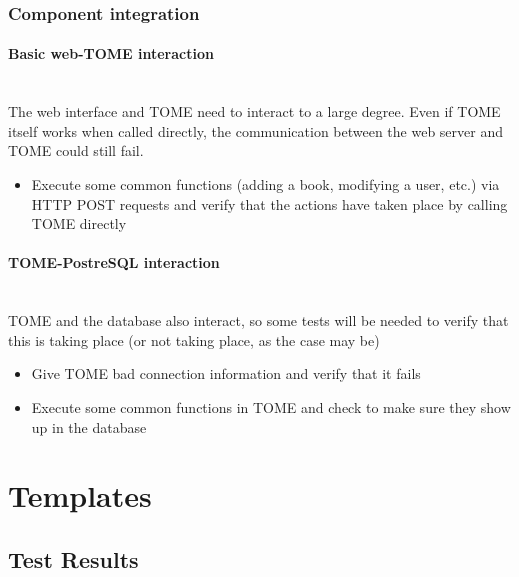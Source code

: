 \documentclass[12pt,titlepage]{article}
\begin{document}
\subsubsection{Component integration}
\paragraph{Basic web-TOME interaction}
\hspace{1pt}\\ The web interface and TOME need to interact to a large degree.  Even if TOME itself works when called directly, the communication between the web server and TOME could still fail.
\begin{itemize}
	\item Execute some common functions (adding a book, modifying a user, etc.) via HTTP POST requests and verify that the actions have taken place by calling TOME directly
\end{itemize}

\paragraph{TOME-PostreSQL interaction}
\hspace{1pt}\\ TOME and the database also interact, so some tests will be needed to verify that this is taking place (or not taking place, as the case may be)
\begin{itemize}
	\item Give TOME bad connection information and verify that it fails
	\item Execute some common functions in TOME and check to make sure they show up in the database
\end{itemize}

\section{Templates}
\subsection{Test Results}
\end{document}
